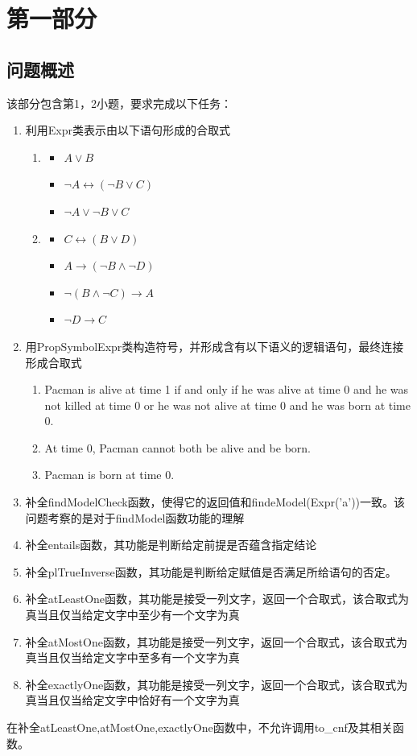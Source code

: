 \chapter{第一部分}
\section{问题概述}
%
%
该部分包含第1，2小题，要求完成以下任务：
\begin{enumerate}
    \item 利用Expr类表示由以下语句形成的合取式
    \begin{enumerate}
        \item \begin{itemize}
            \item $A\lor B$
            \item $\lnot A\leftrightarrow (\lnot B\lor C)$
            \item $\lnot A\lor \lnot B\lor C$
        \end{itemize}
        \item \begin{itemize}
            \item $C\leftrightarrow (B\lor D)$
            \item $A\rightarrow (\lnot B\land \lnot D)$
            \item $\lnot(B\land\lnot C)\rightarrow A$
            \item $\lnot D\rightarrow C$
        \end{itemize}
    \end{enumerate}
    \item 用PropSymbolExpr类构造符号，并形成含有以下语义的逻辑语句，最终连接形成合取式
    \begin{enumerate}
        \item Pacman is alive at time 1 if and only if he was alive at time 0 and he was not killed at time 0 or he was not alive at time 0 and he was born at time 0.
        \item At time 0, Pacman cannot both be alive and be born.
        \item Pacman is born at time 0.
    \end{enumerate}
    \item 补全findModelCheck函数，使得它的返回值和findeModel(Expr('a'))一致。该问题考察的是对于findModel函数功能的理解
    \item 补全entails函数，其功能是判断给定前提是否蕴含指定结论
    \item 补全plTrueInverse函数，其功能是判断给定赋值是否满足所给语句的否定。
    \item 补全atLeastOne函数，其功能是接受一列文字，返回一个合取式，该合取式为真当且仅当给定文字中至少有一个文字为真
    \item 补全atMostOne函数，其功能是接受一列文字，返回一个合取式，该合取式为真当且仅当给定文字中至多有一个文字为真
    \item 补全exactlyOne函数，其功能是接受一列文字，返回一个合取式，该合取式为真当且仅当给定文字中恰好有一个文字为真
\end{enumerate}
在补全atLeastOne,atMostOne,exactlyOne函数中，不允许调用to\_cnf及其相关函数。
%
%

